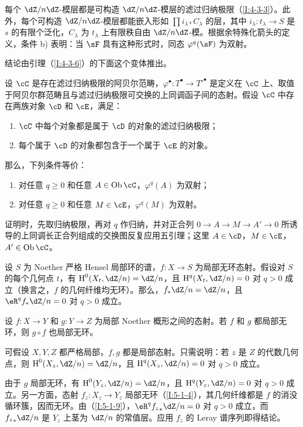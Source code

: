 每个 $\dZ/n\dZ$-模层都是可构造 $\dZ/n\dZ$-模层的滤过归纳极限（\ref{I:4-3-3}）。此外，每个可构造 $\dZ/n\dZ$-模层都能嵌入形如 $\prod i_{\lambda*}C_\lambda$ 的层，其中 $i_\lambda:t_\lambda\to S$ 是 $s$ 的有限个泛化，$C_\lambda$ 为 $t_\lambda$ 上有限秩自由 $\dZ/n\dZ$-模。根据余特殊化箭头的定义，条件 b) 表明：当 $\sF$ 具有这种形式时，同态 $\varphi^q(\sF)$ 为双射。

结论由引理（\ref{I:4-3-6}）的下面这个变体推出。
\begin{lemma}\label{I:5-1-8}
设 $\cC$ 是存在滤过归纳极限的阿贝尔范畴，$\varphi^\bullet:T^\bullet\to{T'}^\bullet$ 是定义在 $\cC$ 上、取值于阿贝尔群范畴且与滤过归纳极限可交换的上同调函子间的态射。假设 $\cC$ 中存在两族对象 $\cD$ 和 $\cE$，满足：
\begin{enumerate}[\indent a)]
\item $\cC$ 中每个对象都是属于 $\cD$ 的对象的滤过归纳极限；
\item 每个属于 $\cD$ 的对象都包含于一个属于 $\cE$ 的对象。
\end{enumerate}
那么，下列条件等价：
\begin{enumerate}[\indent (i)]
\item 对任意 $q\geqslant0$ 和任意 $A\in\ob\cC$，$\varphi^q(A)$ 为双射；
\item 对任意 $q\geqslant0$ 和任意 $M\in\cE$，$\varphi^q(M)$ 为双射。
\end{enumerate}
\end{lemma}
证明时，先取归纳极限，再对 $q$ 作归纳，并对正合列 $0\to A\to M\to A'\to0$ 所诱导的上同调长正合列组成的交换图反复应用五引理；这里 $A\in\cD$，$M\in\cE$，$A'\in\ob\cC$。
\begin{corollary}\label{I:5-1-9}
设 $S$ 为 Noether 严格 Hensel 局部环的谱，$f:X\to S$ 为局部无环态射。假设对 $S$ 的每个几何点 $t$，有 $\h^0(X_t,\dZ/n)=\dZ/n$，且 $\h^q(X_t,\dZ/n)=0$ 对 $q>0$ 成立（换言之，$f$ 的几何纤维均无环）。那么，$f_*\dZ/n=\dZ/n$，且 $\eR^qf_*\dZ/n=0$ 对 $q>0$ 成立。
\end{corollary}
\begin{corollary}\label{I:5-1-10}
设 $f:X\to Y$ 和 $g:Y\to Z$ 为局部 Noether 概形之间的态射。若 $f$ 和 $g$ 都局部无环，则 $g\circ f$ 也局部无环。
\end{corollary}
可假设 $X,Y,Z$ 都严格局部，$f,g$ 都是局部态射。只需说明：若 $z$ 是 $Z$ 的代数几何点，则 $\h^0(X_z,\dZ/n)=\dZ/n$，且 $\h^q(X_z,\dZ/n)=0$ 对 $q>0$ 成立。

由于 $g$ 局部无环，有 $\h^0(Y_z,\dZ/n)=\dZ/n$，且 $\h^q(Y_z,\dZ/n)=0$ 对 $q>0$ 成立。另一方面，态射 $f_z:X_z\to Y_z$ 局部无环（\ref{I:5-1-4}），其几何纤维都是 $f$ 的消没循环簇，因而无环。由（\ref{I:5-1-9}），$\eR^q{f_z}_*\dZ/n=0$ 对 $q>0$ 成立，而 ${f_z}_*\dZ/n$ 是 $Y_z$ 上茎为 $\dZ/n$ 的常值层。应用 $f_z$ 的 Leray 谱序列即得结论。

